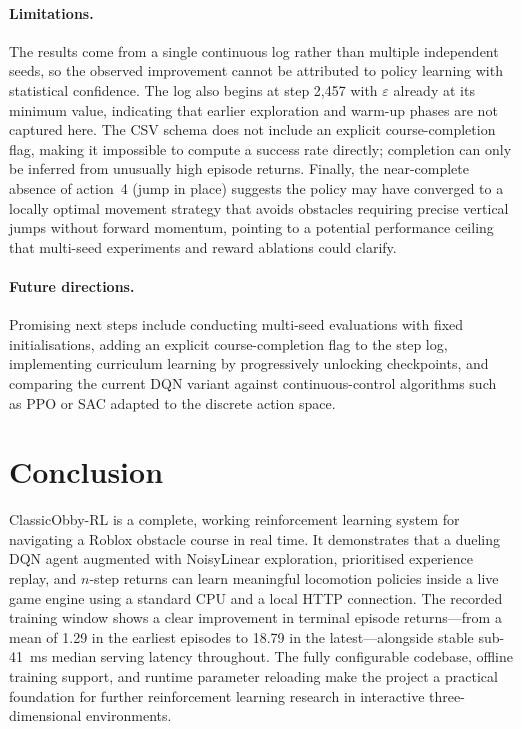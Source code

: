 \documentclass[11pt]{article}
\begin{document}
\paragraph{Limitations.}
The results come from a single continuous log rather than multiple
independent seeds, so the observed improvement cannot be attributed to
policy learning with statistical confidence. The log also begins at step
2{,}457 with $\varepsilon$ already at its minimum value, indicating that
earlier exploration and warm-up phases are not captured here. The CSV
schema does not include an explicit course-completion flag, making it
impossible to compute a success rate directly; completion can only be
inferred from unusually high episode returns. Finally, the near-complete
absence of action~4 (jump in place) suggests the policy may have
converged to a locally optimal movement strategy that avoids obstacles
requiring precise vertical jumps without forward momentum, pointing to a
potential performance ceiling that multi-seed experiments and reward
ablations could clarify.

\paragraph{Future directions.}
Promising next steps include conducting multi-seed evaluations with fixed
initialisations, adding an explicit course-completion flag to the step
log, implementing curriculum learning by progressively unlocking
checkpoints, and comparing the current DQN variant against
continuous-control algorithms such as PPO or SAC adapted to the discrete
action space.

\section{Conclusion}
\label{sec:conclusion}

ClassicObby-RL is a complete, working reinforcement learning system for
navigating a Roblox obstacle course in real time. It demonstrates that a
dueling DQN agent augmented with NoisyLinear exploration, prioritised
experience replay, and $n$-step returns can learn meaningful locomotion
policies inside a live game engine using a standard CPU and a local HTTP
connection. The recorded training window shows a clear improvement in
terminal episode returns---from a mean of 1.29 in the earliest episodes
to 18.79 in the latest---alongside stable sub-\SI{41}{ms} median serving
latency throughout. The fully configurable codebase, offline training
support, and runtime parameter reloading make the project a practical
foundation for further reinforcement learning research in interactive
three-dimensional environments.
\end{document}
